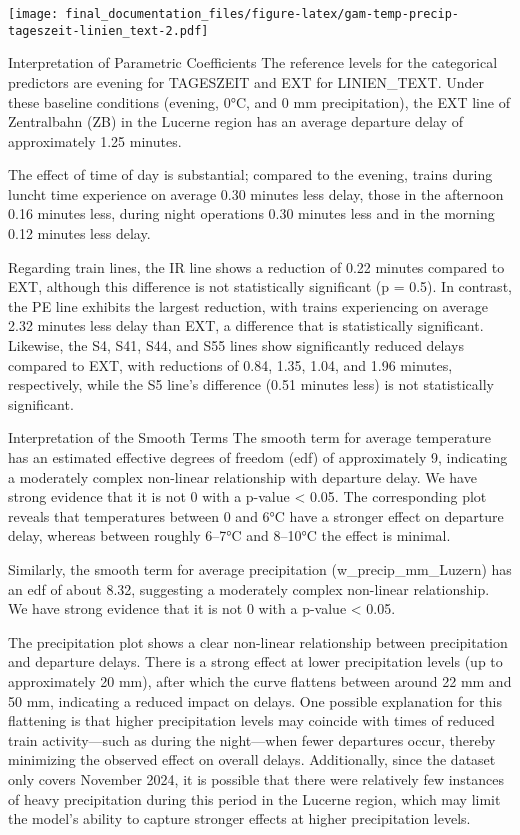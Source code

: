 \documentclass[
]{article}
\begin{document}
\texttt{[image: final\_documentation\_files/figure-latex/gam-temp-precip-tageszeit-linien\_text-2.pdf]}

Interpretation of Parametric Coefficients The reference levels for the
categorical predictors are evening for TAGESZEIT and EXT for
LINIEN\_TEXT. Under these baseline conditions (evening, 0°C, and 0 mm
precipitation), the EXT line of Zentralbahn (ZB) in the Lucerne region
has an average departure delay of approximately 1.25 minutes.

The effect of time of day is substantial; compared to the evening,
trains during luncht time experience on average 0.30 minutes less delay,
those in the afternoon 0.16 minutes less, during night operations 0.30
minutes less and in the morning 0.12 minutes less delay.

Regarding train lines, the IR line shows a reduction of 0.22 minutes
compared to EXT, although this difference is not statistically
significant (p = 0.5). In contrast, the PE line exhibits the largest
reduction, with trains experiencing on average 2.32 minutes less delay
than EXT, a difference that is statistically significant. Likewise, the
S4, S41, S44, and S55 lines show significantly reduced delays compared
to EXT, with reductions of 0.84, 1.35, 1.04, and 1.96 minutes,
respectively, while the S5 line's difference (0.51 minutes less) is not
statistically significant.

Interpretation of the Smooth Terms The smooth term for average
temperature has an estimated effective degrees of freedom (edf) of
approximately 9, indicating a moderately complex non-linear relationship
with departure delay. We have strong evidence that it is not 0 with a
p-value \textless{} 0.05. The corresponding plot reveals that
temperatures between 0 and 6°C have a stronger effect on departure
delay, whereas between roughly 6--7°C and 8--10°C the effect is minimal.

Similarly, the smooth term for average precipitation
(w\_precip\_mm\_Luzern) has an edf of about 8.32, suggesting a
moderately complex non-linear relationship. We have strong evidence that
it is not 0 with a p-value \textless{} 0.05.

The precipitation plot shows a clear non-linear relationship between
precipitation and departure delays. There is a strong effect at lower
precipitation levels (up to approximately 20 mm), after which the curve
flattens between around 22 mm and 50 mm, indicating a reduced impact on
delays. One possible explanation for this flattening is that higher
precipitation levels may coincide with times of reduced train
activity---such as during the night---when fewer departures occur,
thereby minimizing the observed effect on overall delays. Additionally,
since the dataset only covers November 2024, it is possible that there
were relatively few instances of heavy precipitation during this period
in the Lucerne region, which may limit the model's ability to capture
stronger effects at higher precipitation levels.
\end{document}
